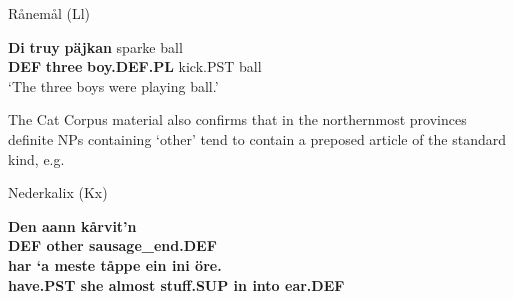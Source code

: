 
\item 

Rånemål (Ll)



 \ea\label{}
\gll \textbf{Di} \textbf{truy} \textbf{päjkan} sparke  ball\\


\textbf{DEF} \textbf{three} \textbf{boy.DEF.PL} kick.PST  ball\\

\glt ‘The three boys were playing ball.’

\z

The Cat Corpus material also confirms that in the northernmost provinces definite NPs containing ‘other’ tend to contain a preposed article of the standard kind, e.g. 


\item 


\item 

Nederkalix (Kx)



 \ea\label{}\gll\bfseries
Den  aann  kårvit’n\\

\bfseries
DEF  other  sausage\_end.DEF\\

 \ea\label{}
\gll har  ‘a  meste  tåppe  ein  ini  öre.\\


have.PST  she  almost  stuff.SUP  in  into  ear.DEF\\

